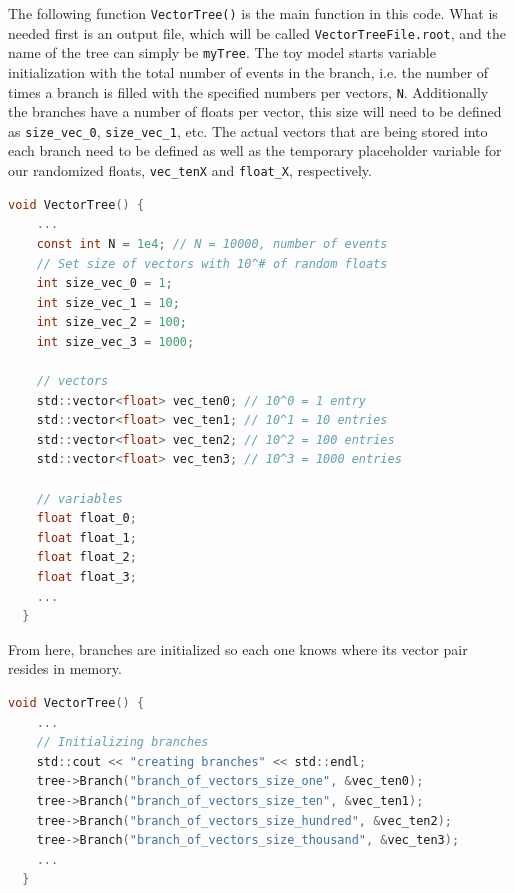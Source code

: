 The following function \verb|VectorTree()| is the main function in this code.
What is needed first is an output file, which will be called \verb|VectorTreeFile.root|, and the name of the tree can simply be \verb|myTree|.
The toy model starts variable initialization with the total number of events in the branch, i.e. the number of times a branch is filled with the specified numbers per vectors, \verb|N|. 
Additionally the branches have a number of floats per vector, this size will need to be defined as \verb|size_vec_0|, \verb|size_vec_1|, etc.  
The actual vectors that are being stored into each branch need to be defined as well as the temporary placeholder variable for our randomized floats, \verb|vec_tenX| and \verb|float_X|, respectively. 
\begin{lstlisting}[language=C]  
  void VectorTree() {
    ...
    const int N = 1e4; // N = 10000, number of events
    // Set size of vectors with 10^# of random floats
    int size_vec_0 = 1;
    int size_vec_1 = 10;
    int size_vec_2 = 100;
    int size_vec_3 = 1000;

    // vectors
    std::vector<float> vec_ten0; // 10^0 = 1 entry
    std::vector<float> vec_ten1; // 10^1 = 10 entries
    std::vector<float> vec_ten2; // 10^2 = 100 entries
    std::vector<float> vec_ten3; // 10^3 = 1000 entries

    // variables
    float float_0;
    float float_1;
    float float_2;
    float float_3;
    ...
  }
\end{lstlisting}

From here, branches are initialized so each one knows where its vector pair resides in memory.
\begin{lstlisting}[language=C]  
  void VectorTree() {
    ...
    // Initializing branches
    std::cout << "creating branches" << std::endl;
    tree->Branch("branch_of_vectors_size_one", &vec_ten0);
    tree->Branch("branch_of_vectors_size_ten", &vec_ten1);
    tree->Branch("branch_of_vectors_size_hundred", &vec_ten2);
    tree->Branch("branch_of_vectors_size_thousand", &vec_ten3);
    ...
  }
\end{lstlisting}

